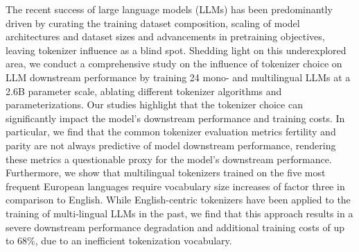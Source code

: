 The recent success of large language models (LLMs) has been predominantly driven by curating the training dataset composition, scaling of model architectures and dataset sizes and advancements in pretraining objectives, leaving tokenizer influence as a blind spot. Shedding light on this underexplored area, we conduct a comprehensive study on the influence of tokenizer choice on LLM downstream performance by training 24 mono- and multilingual LLMs at a 2.6B parameter scale, ablating different tokenizer algorithms and parameterizations. Our studies highlight that the tokenizer choice can significantly impact the model's downstream performance and training costs.  In particular, we find that the common tokenizer evaluation metrics fertility and parity are not always predictive of model downstream performance, rendering these metrics a questionable proxy for the model's downstream performance. Furthermore, we show that multilingual tokenizers trained on the five most frequent European languages require vocabulary size increases of factor three in comparison to English.  While English-centric tokenizers have been applied to the training of multi-lingual LLMs in the past, we find that this approach results in a severe downstream performance degradation and additional training costs of up to 68\%, due to an inefficient tokenization vocabulary.